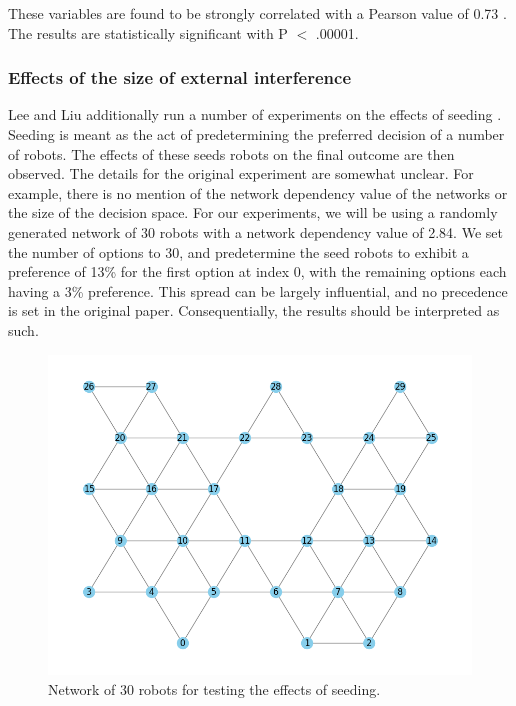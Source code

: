 These variables are found to be strongly correlated with a Pearson value of 0.73 \parencite[page 1765]{pearson}. The results are statistically significant with P $<$ .00001.

\subsubsection{Effects of the size of external interference}
Lee and Liu additionally run a number of experiments on the effects of seeding \parencite{AlgorithmPaper}. Seeding is meant as the act of predetermining the preferred decision of a number of robots. The effects of these seeds robots on the final outcome are then observed.
The details for the original experiment \parencite{AlgorithmPaper} are somewhat unclear. For example, there is no mention of the network dependency value of the networks or the size of the decision space. For our experiments, we will be using a randomly generated network of 30 robots with a network dependency value of 2.84. We set the number of options to 30, and predetermine the seed robots to exhibit a preference of 13\% for the first option at index 0, with the remaining options each having a 3\% preference. This spread can be largely influential, and no precedence is set in the original paper. Consequentially, the results should be interpreted as such.

\begin{figure}[H]
    \centering
    \includegraphics[width=0.9\linewidth]{pictures/30robs.png}
    \caption{Network of 30 robots for testing the effects of seeding.}
    \label{fig:D_relResults}
\end{figure}

